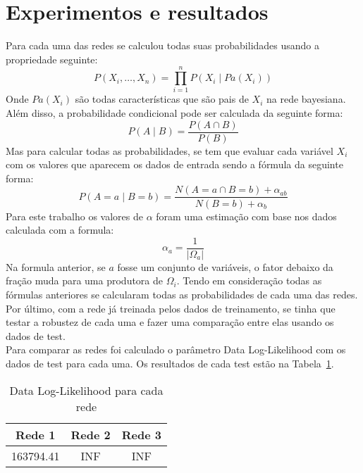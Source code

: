 \section{Experimentos e resultados}

Para cada uma das redes se calculou todas suas probabilidades usando a propriedade seguinte:
	\[ P( X_i , \ldots , X_n ) = \prod_{i=1}^{n} P( X_i \mid {Pa}( X_i ) ) \]
Onde ${Pa}( X_i )$ são todas características que são pais de $X_i$ na rede bayesiana. Além disso, a probabilidade condicional pode ser calculada da seguinte forma:
	\[ P( A \mid B ) = \frac{ P( A \cap B ) }{ P( B ) }\]
Mas para calcular todas as probabilidades, se tem que evaluar cada variável $X_i$ com os valores que aparecem os dados de entrada sendo a fórmula da seguinte forma:
	\[ P( A = a \mid B = b ) = \frac{ N( A = a \cap B = b ) + \alpha_{ab} }{N( B = b ) + \alpha_b } \]
Para este trabalho os valores de $\alpha$ foram uma estimação com base nos dados calculada com a formula:
	\[ \alpha_{a} = \frac{ 1 }{ |\Omega_a|} \]
Na formula anterior, se $a$ fosse um conjunto de variáveis, o fator debaixo da fração muda para uma produtora de $\Omega_i$.
Tendo em consideração todas as fórmulas anteriores se calcularam todas as probabilidades de cada uma das redes.
\\
Por último, com a rede já treinada pelos dados de treinamento, se tinha que testar a robustez de cada uma e fazer uma comparação entre elas usando os dados de test.
\\
Para comparar as redes foi calculado o parâmetro Data Log-Likelihood com os dados de test para cada uma. Os resultados de cada test estão na Tabela~\ref{tab:loglike}.

	\begin{table}[ h ]
		\centering
		\begin{tabular}{ | c | c | c | }
			\hline
			Rede 1 & Rede 2 & Rede 3 \\ \hline
			163794.41 & INF & INF \\ \hline
		\end{tabular}
		\caption{Data Log-Likelihood para cada rede}
		\label{tab:loglike}
	\end{table}

\clearpage